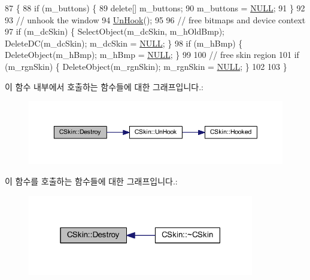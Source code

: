 \begin{DoxyCode}
87 \{
88   \textcolor{keywordflow}{if} (m\_buttons) \{
89     \textcolor{keyword}{delete}[] m\_buttons;
90     m\_buttons = \mbox{\hyperlink{getopt1_8c_a070d2ce7b6bb7e5c05602aa8c308d0c4}{NULL}};
91   \}
92 
93   \textcolor{comment}{// unhook the window}
94   \mbox{\hyperlink{class_c_skin_ab8237ed204df8eb4632ef3bc921783a3}{UnHook}}();
95 
96   \textcolor{comment}{// free bitmaps and device context}
97   \textcolor{keywordflow}{if} (m\_dcSkin) \{ SelectObject(m\_dcSkin, m\_hOldBmp); DeleteDC(m\_dcSkin); m\_dcSkin = 
      \mbox{\hyperlink{getopt1_8c_a070d2ce7b6bb7e5c05602aa8c308d0c4}{NULL}}; \}
98   \textcolor{keywordflow}{if} (m\_hBmp) \{ DeleteObject(m\_hBmp); m\_hBmp = \mbox{\hyperlink{getopt1_8c_a070d2ce7b6bb7e5c05602aa8c308d0c4}{NULL}}; \}
99 
100   \textcolor{comment}{// free skin region}
101   \textcolor{keywordflow}{if} (m\_rgnSkin) \{ DeleteObject(m\_rgnSkin); m\_rgnSkin = \mbox{\hyperlink{getopt1_8c_a070d2ce7b6bb7e5c05602aa8c308d0c4}{NULL}}; \}
102   
103 \}
\end{DoxyCode}
이 함수 내부에서 호출하는 함수들에 대한 그래프입니다.\+:
\nopagebreak
\begin{figure}[H]
\begin{center}
\leavevmode
\includegraphics[width=350pt]{class_c_skin_a13edf7704211f61440871e17eda1d216_cgraph}
\end{center}
\end{figure}
이 함수를 호출하는 함수들에 대한 그래프입니다.\+:
\nopagebreak
\begin{figure}[H]
\begin{center}
\leavevmode
\includegraphics[width=280pt]{class_c_skin_a13edf7704211f61440871e17eda1d216_icgraph}
\end{center}
\end{figure}
\mbox{\label{class_c_skin_ad6adaa12dbedc193c907d4a1b2c2445b}} 

